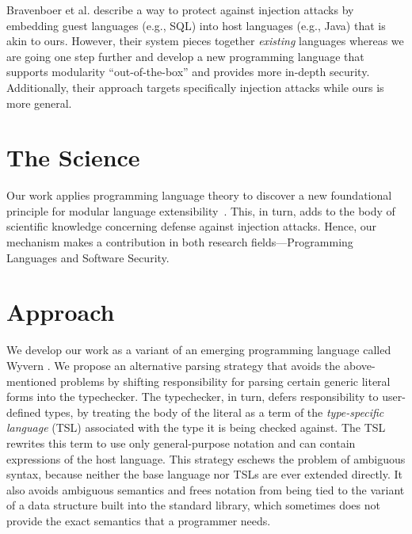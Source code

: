 \documentclass{sig-alternate}
\newcommand{\qs}[1]{}%
\begin{document}
Bravenboer et al. \cite{Bravenboer:2007:PIA:1289971.1289975} describe a way to protect against injection attacks by embedding guest languages (e.g., SQL) into host languages (e.g., Java) that is akin to ours. However, their system pieces together \emph{existing} languages whereas we are going one step further and develop a new programming language that supports modularity ``out-of-the-box'' and provides more in-depth security. Additionally, their approach targets specifically injection attacks while ours is more general.

\section{The Science}

Our work applies programming language theory to discover a new foundational principle for modular language extensibility~\cite{tsl14}. This, in turn, adds to the body of scientific knowledge concerning defense against injection attacks. Hence, our mechanism makes a contribution in both research fields---Programming Languages and Software Security.

\section{Approach}
\qs{Describe your approach in attacking the problem and clearly state how your approach is novel.}

We develop our work as a variant of an emerging programming language called Wyvern \cite{Nistor:2013:WST:2489828.2489830}. We propose an alternative parsing strategy that avoids the above-mentioned problems by shifting responsibility for parsing certain generic literal forms into the typechecker. The typechecker, in turn, defers responsibility to user-defined types, by treating the body of the literal as a term of the \emph{type-specific language} (TSL) associated with the type it is being checked against. The TSL rewrites this term to use only general-purpose notation and can contain expressions of the host language. This strategy eschews the problem of ambiguous syntax, because neither the base language nor TSLs are ever extended directly. It also avoids ambiguous semantics and frees notation from being tied to the variant of a  data structure built into the standard library, which sometimes does not provide the exact semantics that a programmer needs.
\end{document}
